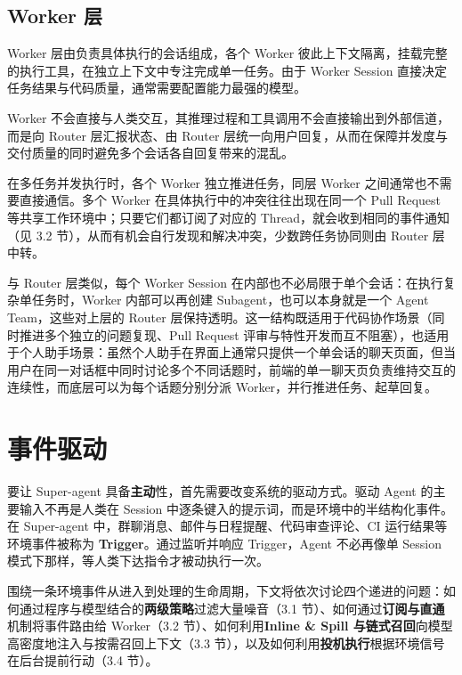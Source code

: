 \documentclass[11pt,a4paper,UTF8,fontset=windows]{ctexart}
\begin{document}
\subsection{Worker 层}

Worker 层由负责具体执行的会话组成，各个 Worker 彼此上下文隔离，挂载完整的执行工具，在独立上下文中专注完成单一任务。由于 Worker Session 直接决定任务结果与代码质量，通常需要配置能力最强的模型。

Worker 不会直接与人类交互，其推理过程和工具调用不会直接输出到外部信道，而是向 Router 层汇报状态、由 Router 层统一向用户回复，从而在保障并发度与交付质量的同时避免多个会话各自回复带来的混乱。

在多任务并发执行时，各个 Worker 独立推进任务，同层 Worker 之间通常也不需要直接通信。多个 Worker 在具体执行中的冲突往往出现在同一个 Pull Request 等共享工作环境中；只要它们都订阅了对应的 Thread，就会收到相同的事件通知（见 3.2 节），从而有机会自行发现和解决冲突，少数跨任务协同则由 Router 层中转。

与 Router 层类似，每个 Worker Session 在内部也不必局限于单个会话：在执行复杂单任务时，Worker 内部可以再创建 Subagent，也可以本身就是一个 Agent Team，这些对上层的 Router 层保持透明。这一结构既适用于代码协作场景（同时推进多个独立的问题复现、Pull Request 评审与特性开发而互不阻塞），也适用于个人助手场景：虽然个人助手在界面上通常只提供一个单会话的聊天页面，但当用户在同一对话框中同时讨论多个不同话题时，前端的单一聊天页负责维持交互的连续性，而底层可以为每个话题分别分派 Worker，并行推进任务、起草回复。



\section{事件驱动}

要让 Super-agent 具备\textbf{主动}性，首先需要改变系统的驱动方式。驱动 Agent 的主要输入不再是人类在 Session 中逐条键入的提示词，而是环境中的半结构化事件。在 Super-agent 中，群聊消息、邮件与日程提醒、代码审查评论、CI 运行结果等环境事件被称为 \textbf{Trigger}。通过监听并响应 Trigger，Agent 不必再像单 Session 模式下那样，等人类下达指令才被动执行一次。

围绕一条环境事件从进入到处理的生命周期，下文将依次讨论四个递进的问题：如何通过程序与模型结合的\textbf{两级策略}过滤大量噪音（3.1 节）、如何通过\textbf{订阅与直通}机制将事件路由给 Worker（3.2 节）、如何利用\textbf{Inline \& Spill 与链式召回}向模型高密度地注入与按需召回上下文（3.3 节），以及如何利用\textbf{投机执行}根据环境信号在后台提前行动（3.4 节）。
\end{document}
